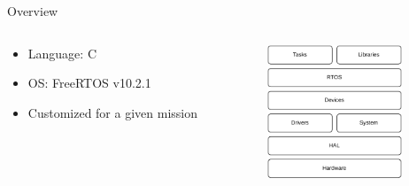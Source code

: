 %
%
%
%
%

%
%
%
%
%


\begin{frame}{Overview}

    \begin{columns}[t]
        \begin{column}[t]{0.6\textwidth}
            \begin{itemize}
                \item Language: C
                \vspace{0.3cm}
                \item OS: FreeRTOS v10.2.1
                \vspace{0.3cm}
                \item Customized for a given mission
            \end{itemize}
        \end{column}
        \begin{column}[t]{0.4\textwidth}
            \begin{figure}[!ht]
                \begin{center}
                    \includegraphics[width=4cm]{figures/obdh2-layers.pdf}
                \end{center}
            \end{figure}
        \end{column}
    \end{columns}

\end{frame}



